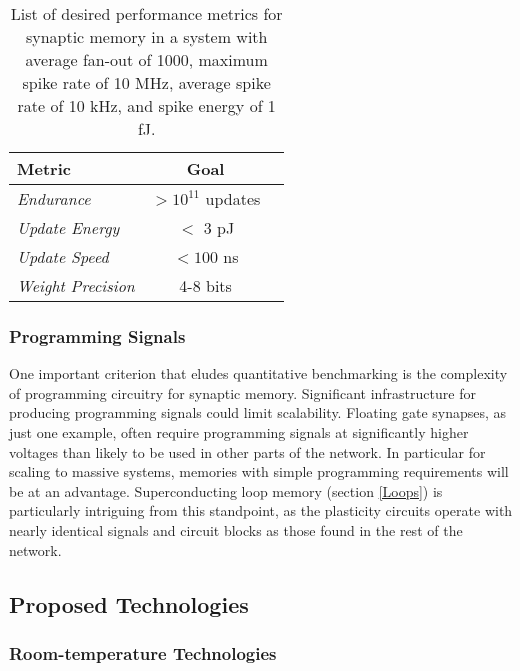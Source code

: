 \documentclass[twocolumn]{article}
\begin{document}
\begin{table}[h!]
  \begin{center}
    \label{tab:memory_metrics}
    \begin{tabular}{l|c|r} %
      \textbf{Metric} & \textbf{Goal} \\
      \hline
      \textit{Endurance} & $>10^{11}$ updates \\
      \textit{Update Energy} & $<$ 3 pJ\\
      \textit{Update Speed} & $<100$ ns \\
      \textit{Weight Precision} & 4-8 bits
      
    \end{tabular}
    \caption{List of desired performance metrics for synaptic memory in a system with average fan-out of 1000, maximum spike rate of 10 MHz, average spike rate of 10 kHz, and spike energy of 1 fJ.}
  \end{center}
\end{table}

\subsubsection{Programming Signals}
One important criterion that eludes quantitative benchmarking is the complexity of programming circuitry for synaptic memory. Significant infrastructure for producing programming signals could limit scalability. Floating gate synapses, as just one example, often require programming signals at significantly higher voltages than likely to be used in other parts of the network. In particular for scaling to massive systems, memories with simple programming requirements will be at an advantage. Superconducting loop memory (section \ref{Loops}) is particularly intriguing from this standpoint, as the plasticity circuits operate with  nearly identical signals and circuit blocks as those found in the rest of the network.

\subsection{Proposed Technologies}\label{Proposed}
\subsubsection{Room-temperature Technologies}
\end{document}

